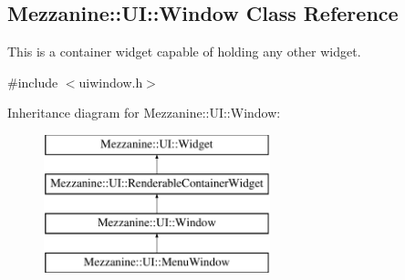 \hypertarget{classMezzanine_1_1UI_1_1Window}{
\subsection{Mezzanine::UI::Window Class Reference}
\label{classMezzanine_1_1UI_1_1Window}
}


This is a container widget capable of holding any other widget.  




{\ttfamily \#include $<$uiwindow.h$>$}

Inheritance diagram for Mezzanine::UI::Window:\begin{figure}[H]
\begin{center}
\leavevmode
\includegraphics[height=4.000000cm]{classMezzanine_1_1UI_1_1Window}
\end{center}
\end{figure}
